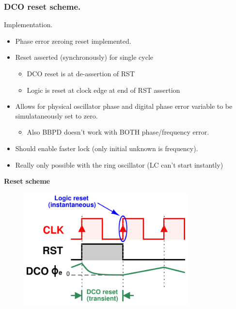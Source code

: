\documentclass[t, screen, aspectratio=43]{beamer}
\begin{document}
\begin{frame}
	\frametitle{DCO reset scheme.}
	\begin{block}{Implementation.}
		\begin{minipage}{6cm}
			\vspace{1em}
			\tiny
			\begin{itemize}[itemsep=4pt,label=\protect---]
			        \item Phase error zeroing reset implemented.
			        \item Reset asserted (synchronously) for single cycle 
					\begin{itemize}[itemsep=4pt,label=$\bullet$]
						\item DCO reset is at de-assertion of RST
						\item Logic is reset at clock edge at end of RST assertion
					\end{itemize}
					\item Allows for physical oscillator phase and digital phase error variable to be simulataneously set to zero.
					\begin{itemize}[itemsep=4pt,label=$\bullet$]
						\item Also BBPD doesn't work with BOTH phase/frequency error.
					\end{itemize}
					\item Should enable faster lock (only initial unknown is frequency).
					\item Really only possible with the ring oscillator (LC can't start instantly)
			\end{itemize}
		\end{minipage}%
		\begin{minipage}{6cm}
			\tiny \textbf{\hspace{3em}Reset scheme}
			\begin{figure}[htb!]
			        \centering
			        \includegraphics[width=0.8\textwidth, angle=0]{pll_reset}
			\end{figure}


		\end{minipage}%

	\end{block}	
\end{frame}
\end{document}
